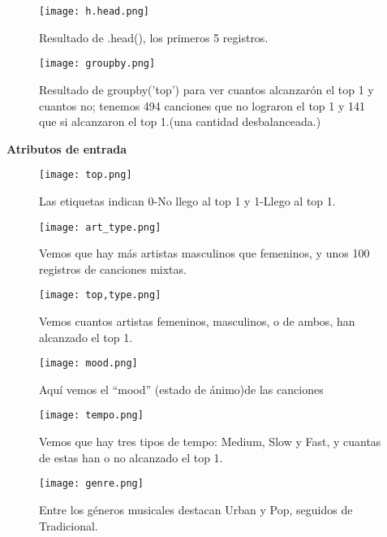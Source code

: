 \documentclass{article}
\begin{document}
\begin{figure}[H]
\centering
\texttt{[image: h.head.png]}
\caption{ {\small Resultado de .head(), los primeros 5 registros. }}
\label{figura02}
\end{figure}

\begin{figure}[H]
    \centering
\texttt{[image: groupby.png]}
    \caption{{\small Resultado de groupby('top') para ver cuantos alcanzarón el top 1 y cuantos no; tenemos 494 canciones que no lograron el top 1 y 141 que si alcanzaron el top 1.(una cantidad desbalanceada.)}}
    \label{figura03}
\end{figure}

\textbf{Atributos de entrada}

\begin{figure}[H]
    \centering
\texttt{[image: top.png]}
    \caption{{\small Las etiquetas indican 0-No llego al top 1 y 1-Llego al top 1.}}
    \label{fig:enter-label}
\end{figure}

\begin{figure}[H]
    \centering
\texttt{[image: art\_type.png]}
    \caption{{\small Vemos que hay más artistas masculinos que femeninos, y unos 100 registros de canciones mixtas.}}
    \label{fig:enter-label}
\end{figure}

\begin{figure}[H]
    \centering
\texttt{[image: top,type.png]}
    \caption{{\small Vemos cuantos artistas femeninos, masculinos, o de ambos, han alcanzado el top 1.}}
    \label{fig:enter-label}
\end{figure}


\begin{figure}[H]
    \centering
\texttt{[image: mood.png]}
    \caption{{\small Aquí vemos el ``mood'' (estado de ánimo)de las canciones}}
    \label{fig:enter-label}
\end{figure}


\begin{figure}[H]
    \centering
\texttt{[image: tempo.png]}
    \caption{{\small Vemos que hay tres tipos de tempo: Medium, Slow y Fast, y cuantas de estas han o no alcanzado el top 1.}}
    \label{fig:enter-label}
\end{figure}

\begin{figure}[H]
    \centering
\texttt{[image: genre.png]}
    \caption{{\small Entre los géneros musicales destacan Urban y Pop, seguidos de Tradicional.}}
    \label{fig:enter-label}
\end{figure}
\end{document}
